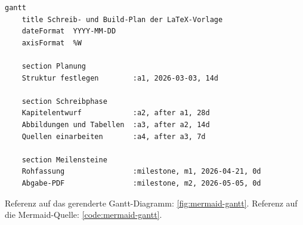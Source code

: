 \begin{lstlisting}[language={}, caption={Mermaid-Beispiel (Gantt mit Meilensteinen)}, label={code:mermaid-gantt}]
gantt
    title Schreib- und Build-Plan der LaTeX-Vorlage
    dateFormat  YYYY-MM-DD
    axisFormat  %W

    section Planung
    Struktur festlegen        :a1, 2026-03-03, 14d

    section Schreibphase
    Kapitelentwurf            :a2, after a1, 28d
    Abbildungen und Tabellen  :a3, after a2, 14d
    Quellen einarbeiten       :a4, after a3, 7d

    section Meilensteine
    Rohfassung                :milestone, m1, 2026-04-21, 0d
    Abgabe-PDF                :milestone, m2, 2026-05-05, 0d
\end{lstlisting}

Referenz auf das gerenderte Gantt-Diagramm: \ref{fig:mermaid-gantt}. Referenz auf die Mermaid-Quelle: \ref{code:mermaid-gantt}.
